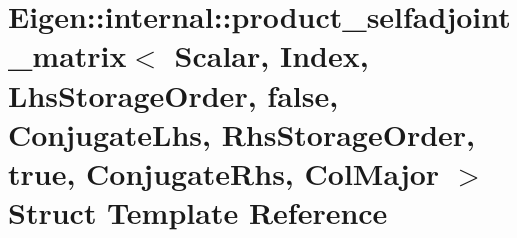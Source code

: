 \hypertarget{struct_eigen_1_1internal_1_1product__selfadjoint__matrix_3_01_scalar_00_01_index_00_01_lhs_storadd08b9e76d992b3a954c3041feed2ed9}{}\section{Eigen\+:\+:internal\+:\+:product\+\_\+selfadjoint\+\_\+matrix$<$ Scalar, Index, Lhs\+Storage\+Order, false, Conjugate\+Lhs, Rhs\+Storage\+Order, true, Conjugate\+Rhs, Col\+Major $>$ Struct Template Reference}
\label{struct_eigen_1_1internal_1_1product__selfadjoint__matrix_3_01_scalar_00_01_index_00_01_lhs_storadd08b9e76d992b3a954c3041feed2ed9}
